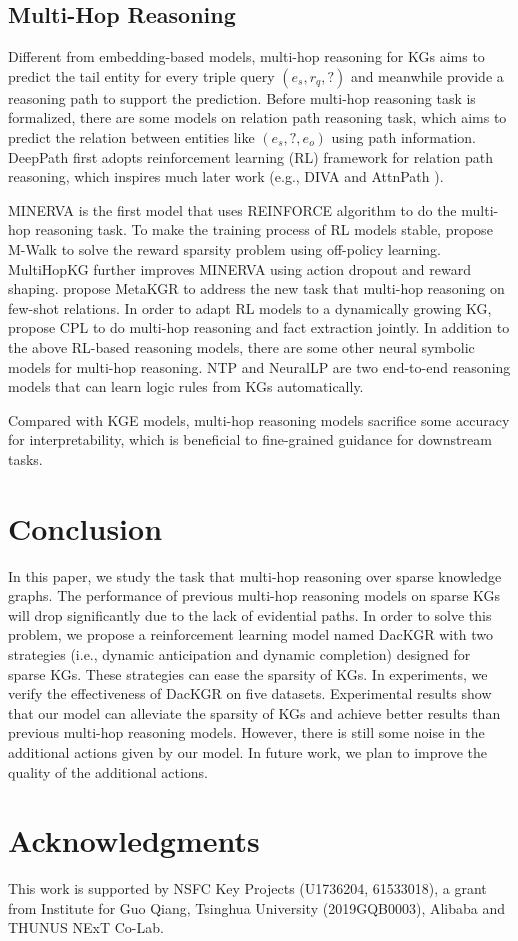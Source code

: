 \documentclass[11pt,a4paper]{article}
\begin{document}
\subsection{Multi-Hop Reasoning}

Different from embedding-based models, multi-hop reasoning for KGs aims to predict the tail entity for every triple query $(e_s, r_q, ?)$ and meanwhile provide a reasoning path to support the prediction. 
Before multi-hop reasoning task is formalized, there are some models on 
relation path reasoning task, which aims to predict the relation between entities like $(e_s, ?, e_o)$ using path information. DeepPath \cite{DeepPath} first adopts reinforcement learning (RL) framework for relation path reasoning, which inspires much later work (e.g., DIVA \cite{DIVA} and AttnPath \cite{ATTPath}). 

MINERVA \cite{MINERVA} is the first model that uses REINFORCE algorithm to do the multi-hop reasoning task. To make the training process of RL models stable, \citeauthor{M-Walk} propose M-Walk to solve the reward sparsity problem using off-policy learning. MultiHopKG \cite{MultiHop} further improves MINERVA using action dropout and reward shaping. \citet{MetaKGR} propose MetaKGR to address the new task that multi-hop reasoning on few-shot relations. In order to adapt RL models to a dynamically growing KG, \citet{CPL} propose CPL to do multi-hop reasoning and fact extraction jointly. In addition to the above RL-based reasoning models, there are some other neural symbolic models for multi-hop reasoning. NTP \cite{NTP} and NeuralLP \cite{NeuralLP} are two end-to-end reasoning models that can learn logic rules from KGs automatically. 

Compared with KGE models, multi-hop reasoning models sacrifice some accuracy for interpretability, which is beneficial to fine-grained guidance for downstream tasks.

\section{Conclusion}

In this paper, we study the task that multi-hop reasoning over sparse knowledge graphs. The performance of previous multi-hop reasoning models on sparse KGs will drop significantly due to the lack of evidential paths. In order to solve this problem, we propose a reinforcement learning model named DacKGR with two strategies (i.e., dynamic anticipation and dynamic completion) designed for sparse KGs. These strategies can ease the sparsity of KGs. In experiments, we verify the effectiveness of DacKGR on five datasets. Experimental results show that our model can alleviate the sparsity of KGs and achieve better results than previous multi-hop reasoning models.
However, there is still some noise in the additional actions given by our model. In future work, we plan to improve the quality of the additional actions.

\section*{Acknowledgments}

This work is supported by NSFC Key Projects (U1736204, 61533018), a grant from Institute for Guo Qiang, Tsinghua University (2019GQB0003), Alibaba and THUNUS NExT Co-Lab.



\end{document}

